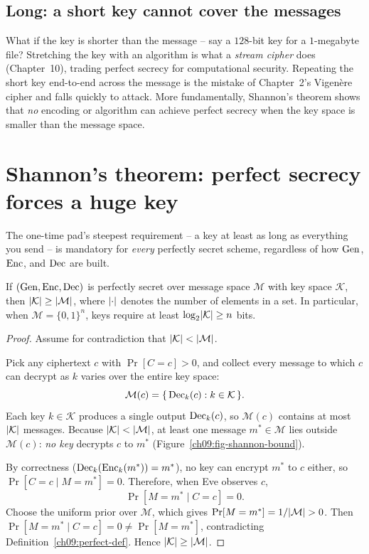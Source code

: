 \subsection{Long: a short key cannot cover the messages}
\label{ch09:must-long}

What if the key is shorter than the message -- say a $128$-bit key for a $1$-megabyte file? Stretching the key with an algorithm is what a \emph{stream cipher} does (Chapter~10), trading perfect secrecy for computational security. Repeating the short key end-to-end across the message is the mistake of Chapter~2's Vigen\`ere cipher and falls quickly to attack. More fundamentally, Shannon's theorem shows that \emph{no} encoding or algorithm can achieve perfect secrecy when the key space is smaller than the message space.

\section{Shannon's theorem: perfect secrecy forces a huge key}
\label{ch09:key-length}

The one-time pad's steepest requirement -- a key at least as long as everything you send -- is mandatory for \emph{every} perfectly secret scheme, regardless of how $\operatorname{Gen}$, $\operatorname{Enc}$, and $\operatorname{Dec}$ are built.

\begin{theorem}
\label{ch09:shannon-bound}
If $(\operatorname{Gen},\operatorname{Enc},\operatorname{Dec})$ is perfectly secret over message space $\mathcal{M}$ with key space $\mathcal{K}$, then $\lvert\mathcal{K}\rvert \ge \lvert\mathcal{M}\rvert$, where $\lvert\cdot\rvert$ denotes the number of elements in a set. In particular, when $\mathcal{M} = \{0,1\}^n$, keys require at least $\log_2 \lvert\mathcal{K}\rvert \ge n$ bits.
\end{theorem}

\begin{proof}
Assume for contradiction that $\lvert\mathcal{K}\rvert < \lvert\mathcal{M}\rvert$.

Pick any ciphertext $c$ with $\Pr[C = c] > 0$, and collect every message to which $c$ can decrypt as $k$ varies over the entire key space:
\[
  \mathcal{M}(c) = \{\,\operatorname{Dec}_k(c) : k \in \mathcal{K}\,\}.
\]
Each key $k \in \mathcal{K}$ produces a single output $\operatorname{Dec}_k(c)$, so $\mathcal{M}(c)$ contains at most $\lvert\mathcal{K}\rvert$ messages. Because $\lvert\mathcal{K}\rvert < \lvert\mathcal{M}\rvert$, at least one message $m^{*} \in \mathcal{M}$ lies outside $\mathcal{M}(c)$: \emph{no key} decrypts $c$ to $m^{*}$ (Figure~\ref{ch09:fig-shannon-bound}).

By correctness ($\operatorname{Dec}_k(\operatorname{Enc}_k(m^{*})) = m^{*}$), no key can encrypt $m^{*}$ to $c$ either, so $\Pr[C = c \mid M = m^{*}] = 0$. Therefore, when Eve observes $c$,
\[
  \Pr[M = m^{*} \mid C = c] = 0.
\]
Choose the uniform prior over $\mathcal{M}$, which gives $\Pr[M = m^{*}] = 1/\lvert\mathcal{M}\rvert > 0$. Then $\Pr[M = m^{*} \mid C = c] = 0 \ne \Pr[M = m^{*}]$, contradicting Definition~\ref{ch09:perfect-def}. Hence $\lvert\mathcal{K}\rvert \ge \lvert\mathcal{M}\rvert$.
\end{proof}

